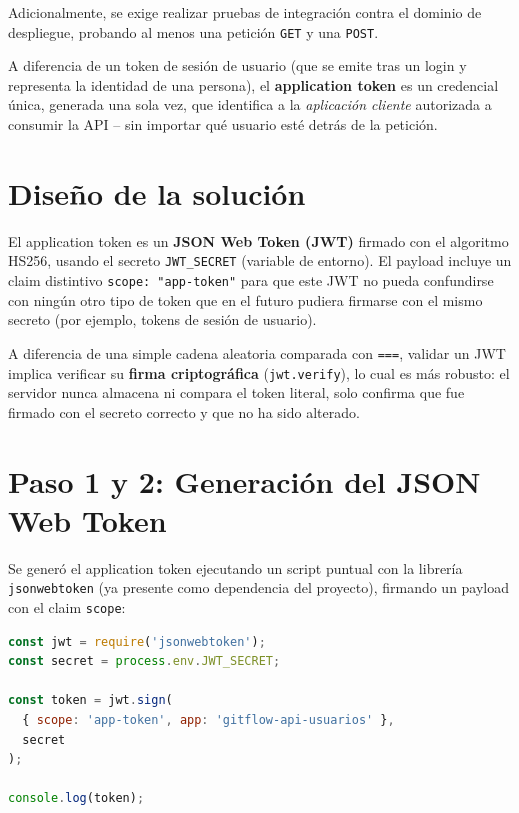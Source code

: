\documentclass[11pt,letterpaper]{article}
\begin{document}
Adicionalmente, se exige realizar pruebas de integración contra el dominio de despliegue,
probando al menos una petición \texttt{GET} y una \texttt{POST}.

A diferencia de un token de sesión de usuario (que se emite tras un login y representa la
identidad de una persona), el \textbf{application token} es un credencial única, generada una
sola vez, que identifica a la \emph{aplicación cliente} autorizada a consumir la API -- sin
importar qué usuario esté detrás de la petición.

\section{Diseño de la solución}

El application token es un \textbf{JSON Web Token (JWT)} firmado con el algoritmo HS256, usando
el secreto \texttt{JWT\_SECRET} (variable de entorno). El payload incluye un claim distintivo
\texttt{scope: "app-token"} para que este JWT no pueda confundirse con ningún otro tipo de token
que en el futuro pudiera firmarse con el mismo secreto (por ejemplo, tokens de sesión de usuario).

A diferencia de una simple cadena aleatoria comparada con \texttt{===}, validar un JWT implica
verificar su \textbf{firma criptográfica} (\texttt{jwt.verify}), lo cual es más robusto: el
servidor nunca almacena ni compara el token literal, solo confirma que fue firmado con el
secreto correcto y que no ha sido alterado.

\newpage
\section{Paso 1 y 2: Generación del JSON Web Token}

Se generó el application token ejecutando un script puntual con la librería \texttt{jsonwebtoken}
(ya presente como dependencia del proyecto), firmando un payload con el claim \texttt{scope}:

\begin{lstlisting}[language=JavaScript, caption=Generación del application token]
const jwt = require('jsonwebtoken');
const secret = process.env.JWT_SECRET;

const token = jwt.sign(
  { scope: 'app-token', app: 'gitflow-api-usuarios' },
  secret
);

console.log(token);
\end{lstlisting}
\end{document}
